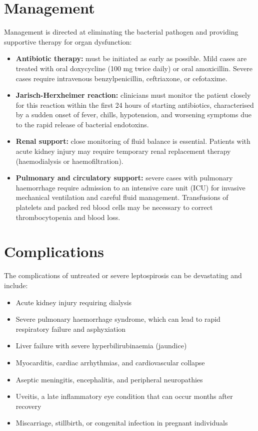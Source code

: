\section*{Management}
Management is directed at eliminating the bacterial pathogen and providing supportive therapy for organ dysfunction:
\begin{itemize}
    \item \textbf{Antibiotic therapy:} must be initiated as early as possible. Mild cases are treated with oral doxycycline (100 mg twice daily) or oral amoxicillin. Severe cases require intravenous benzylpenicillin, ceftriaxone, or cefotaxime.
    \item \textbf{Jarisch-Herxheimer reaction:} clinicians must monitor the patient closely for this reaction within the first 24 hours of starting antibiotics, characterised by a sudden onset of fever, chills, hypotension, and worsening symptoms due to the rapid release of bacterial endotoxins.
    \item \textbf{Renal support:} close monitoring of fluid balance is essential. Patients with acute kidney injury may require temporary renal replacement therapy (haemodialysis or haemofiltration).
    \item \textbf{Pulmonary and circulatory support:} severe cases with pulmonary haemorrhage require admission to an intensive care unit (ICU) for invasive mechanical ventilation and careful fluid management. Transfusions of platelets and packed red blood cells may be necessary to correct thrombocytopenia and blood loss.
\end{itemize}

\section*{Complications}
The complications of untreated or severe leptospirosis can be devastating and include:
\begin{itemize}
    \item Acute kidney injury requiring dialysis
    \item Severe pulmonary haemorrhage syndrome, which can lead to rapid respiratory failure and asphyxiation
    \item Liver failure with severe hyperbilirubinaemia (jaundice)
    \item Myocarditis, cardiac arrhythmias, and cardiovascular collapse
    \item Aseptic meningitis, encephalitis, and peripheral neuropathies
    \item Uveitis, a late inflammatory eye condition that can occur months after recovery
    \item Miscarriage, stillbirth, or congenital infection in pregnant individuals
\end{itemize}


